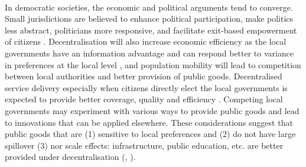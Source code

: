\documentclass[12pt, a4paper]{article}
\begin{document}
\paragraph{}  In democratic societies, the economic and political arguments tend to converge. Small jurisdictions are believed to enhance political participation, make politics less abstract, politicians more responsive, and facilitate exit-based empowerment of citizens \parencite{hansen_size_2014}. Decentralisation will also increase economic efficiency as the local governments have an information advantage and can respond better to variance in preferences at the local level \parencite{oates_fiscal_1972}, and population mobility will lead to competition between local authorities and better provision of public goods. Decentralised service delivery especially when citizens directly elect the local governments is expected to provide better coverage, quality and efficiency \parencite{smoke2015rethinking}. Competing local governments may experiment with various ways to provide public goods and lead to innovations that can be applied elsewhere. These considerations suggest that public goods that are (1) sensitive to local preferences and (2) do not have large spillover (3) nor scale effects: infrastructure, public education, etc. are better provided under decentralisation (\cite{tiebout_economies_1960}, \cite{oates_fiscal_1972}).
\end{document}
